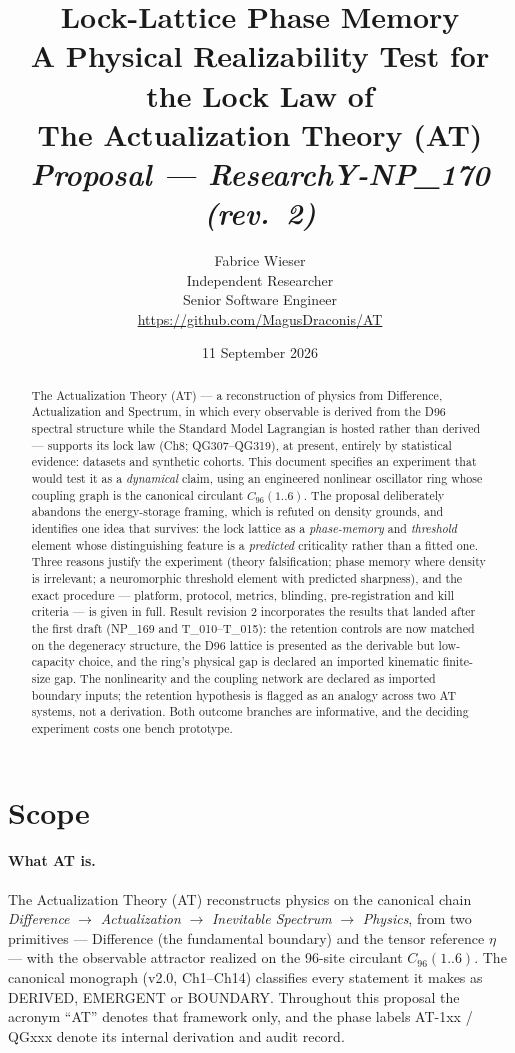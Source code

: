 \documentclass[11pt,a4paper]{article}
\title{\textbf{Lock-Lattice Phase Memory}\\[0.35em]
\large A Physical Realizability Test for the Lock Law of\\[0.15em]
\large The Actualization Theory (AT)\\[0.35em]
\normalsize\emph{Proposal --- ResearchY-NP\_170 (rev.\ 2)}}
\author{Fabrice Wieser\\[1mm]
  \small Independent Researcher\\[0.5mm]
  \small Senior Software Engineer\\[0.5mm]
  \small \url{https://github.com/MagusDraconis/AT}}
\date{11 September 2026}
\newcommand{\Cninety}{\ensuremath{C_{96}(1..6)}}
\begin{document}
\maketitle

\begin{abstract}
\noindent
The Actualization Theory (AT) --- a reconstruction of physics from Difference, Actualization and
Spectrum, in which every observable is derived from the D96 spectral structure while the Standard
Model Lagrangian is hosted rather than derived --- supports its lock law (Ch8; QG307--QG319), at
present, entirely by statistical evidence: datasets and synthetic cohorts. This document specifies an
experiment that would test it as a \emph{dynamical} claim, using an engineered nonlinear
oscillator ring whose coupling graph is the canonical circulant \Cninety. The proposal deliberately
abandons the energy-storage framing, which is refuted on density grounds, and identifies one idea
that survives: the lock lattice as a \emph{phase-memory} and \emph{threshold} element whose
distinguishing feature is a \emph{predicted} criticality rather than a fitted one. Three reasons
justify the experiment (theory falsification; phase memory where density is irrelevant; a
neuromorphic threshold element with predicted sharpness), and the exact procedure --- platform,
protocol, metrics, blinding, pre-registration and kill criteria --- is given in full. Result
revision 2 incorporates the results that landed after the first draft (NP\_169 and T\_010--T\_015):
the retention controls are now matched on the degeneracy structure, the D96 lattice is presented as
the derivable but low-capacity choice, and the ring's physical gap is declared an imported
kinematic finite-size gap. The
nonlinearity and the coupling network are declared as imported boundary inputs; the retention
hypothesis is flagged as an analogy across two AT systems, not a derivation. Both outcome branches
are informative, and the deciding experiment costs one bench prototype.
\end{abstract}

\section{Scope}

\paragraph{What AT is.} The Actualization Theory (AT) reconstructs physics on the canonical chain
\emph{Difference} $\to$ \emph{Actualization} $\to$ \emph{Inevitable Spectrum} $\to$
\emph{Physics}, from two primitives --- Difference (the fundamental boundary) and the tensor
reference $\eta$ --- with the observable attractor realized on the 96-site circulant
$C_{96}(1..6)$. The canonical monograph (v2.0, Ch1--Ch14) classifies every statement it makes as
DERIVED, EMERGENT or BOUNDARY. Throughout this proposal the acronym ``AT'' denotes that framework
only, and the phase labels AT-1xx / QGxxx denote its internal derivation and audit record.
\end{document}
